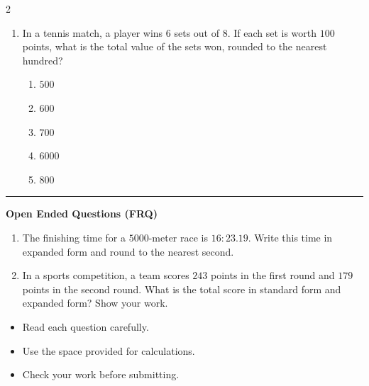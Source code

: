\documentclass[10pt]{article}
\begin{document}
\begin{multicols}{2}
\begin{enumerate}[label=\textbf{Q\arabic*.}, leftmargin=*, itemsep=6pt, parsep=0pt]
  \item \small In a tennis match, a player wins $6$ sets out of $8$. If each set is worth $100$ points, what is the total value of the sets won, rounded to the nearest hundred?
  \begin{enumerate}[label=(\Alph*), leftmargin=0.6cm, nosep, itemsep=2pt]
    \item $500$
    \item $600$
    \item $700$
    \item $6000$
    \item $800$
  \end{enumerate}

\end{enumerate}
\end{multicols}

\vspace{-0.2cm}
\hrule
\vspace{0.2cm}
\textbf{\small Open Ended Questions (FRQ)}
\begin{enumerate}[label=\textbf{Q\arabic*.}, start=9, itemsep=5pt, topsep=0pt]

  \item \small The finishing time for a $5000$-meter race is $16:23.19$. Write this time in expanded form and round to the nearest second. \vspace{2cm}

  \item \small In a sports competition, a team scores $243$ points in the first round and $179$ points in the second round. What is the total score in standard form and expanded form? Show your work. \vspace{2cm}

\end{enumerate}

\vfill

\begin{tcolorbox}[colback=blue!5, colframe=mainblue!50, title=\small \textbf{Chef's Tips}, fonttitle=\bfseries, bottom=1mm]
\begin{itemize}[noitemsep, topsep=2pt, leftmargin=0.5cm]
  \item \scriptsize Read each question carefully.\item \scriptsize Use the space provided for calculations.\item \scriptsize Check your work before submitting.
\end{itemize}
\end{tcolorbox}
\end{document}
